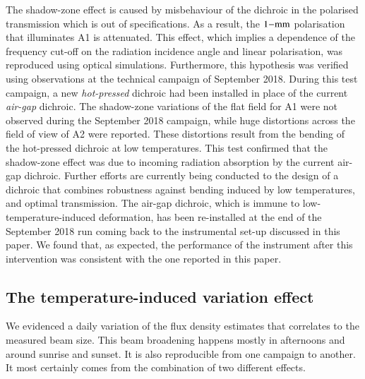 \documentclass[traditionalabstract]{aa}
\newcommand{\lp}[1]{#1}
\begin{document}
{The shadow-zone effect is caused by {\lp misbehaviour of the dichroic in
the polarised transmission which is out of specifications. As a
result, the $1\rm{-mm}$ polarisation that illuminates A1 is
attenuated.}
This effect,
which implies {\lp a dependence of the frequency cut-off on the radiation
incidence angle and linear polarisation,}
was reproduced using optical simulations. Furthermore, this hypothesis was
verified using observations at the technical campaign of September
2018. During this test campaign, a new \emph{hot-pressed} dichroic had
been installed in place of the current \emph{air-gap} dichroic.
The shadow-zone variations of the flat field for A1 were
not observed during the September 2018 campaign, while huge distortions
across the field of view of A2 were reported. These distortions result from the bending of the hot-pressed dichroic at low temperatures.
This test confirmed that the shadow-zone effect was due
to incoming radiation absorption by the current air-gap dichroic.
Further efforts are currently being conducted to the design of a dichroic that
combines robustness against bending induced by low temperatures, and
optimal transmission.
{\lp The air-gap dichroic, which is immune to low-temperature-induced
deformation, has been re-installed at the end of the September 2018
run coming back to the instrumental set-up discussed in this paper. We
found that, as expected, the performance of the instrument
after this intervention was consistent with the one reported in this
paper.}


\subsection{The temperature-induced variation effect}
\label{se:beam_variation}

We evidenced a daily variation of the flux density estimates that correlates to the
measured beam size. This beam broadening happens mostly in afternoons and around
sunrise and sunset. It is also reproducible from one campaign to another. It most certainly
comes from the combination of two different effects.

}
\end{document}
